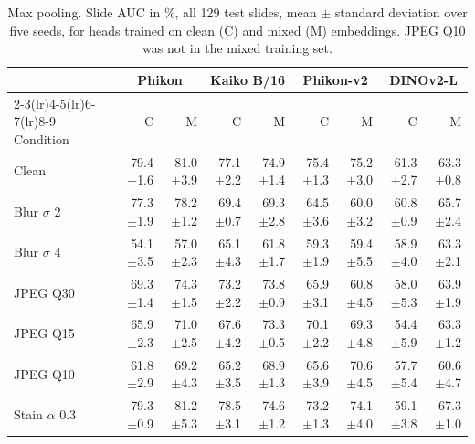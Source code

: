 \begin{table}[H]\centering\small
\caption{Max pooling. Slide AUC in \%, all 129 test slides, mean $\pm$ standard deviation over five seeds, for heads trained on clean (C) and mixed (M) embeddings. JPEG Q10 was not in the mixed training set.}
\label{tab:app-max}
\setlength{\tabcolsep}{3.5pt}
\begin{tabular}{lrrrrrrrr}
\toprule
 & \multicolumn{2}{c}{Phikon} & \multicolumn{2}{c}{Kaiko B/16} & \multicolumn{2}{c}{Phikon-v2} & \multicolumn{2}{c}{DINOv2-L}\\
\cmidrule(lr){2-3}\cmidrule(lr){4-5}\cmidrule(lr){6-7}\cmidrule(lr){8-9}
Condition & C & M & C & M & C & M & C & M\\
\midrule
Clean & 79.4{\scriptsize$\pm$1.6} & 81.0{\scriptsize$\pm$3.9} & 77.1{\scriptsize$\pm$2.2} & 74.9{\scriptsize$\pm$1.4} & 75.4{\scriptsize$\pm$1.3} & 75.2{\scriptsize$\pm$3.0} & 61.3{\scriptsize$\pm$2.7} & 63.3{\scriptsize$\pm$0.8}\\
Blur $\sigma$ 2 & 77.3{\scriptsize$\pm$1.9} & 78.2{\scriptsize$\pm$1.2} & 69.4{\scriptsize$\pm$0.7} & 69.3{\scriptsize$\pm$2.8} & 64.5{\scriptsize$\pm$3.6} & 60.0{\scriptsize$\pm$3.2} & 60.8{\scriptsize$\pm$0.9} & 65.7{\scriptsize$\pm$2.4}\\
Blur $\sigma$ 4 & 54.1{\scriptsize$\pm$3.5} & 57.0{\scriptsize$\pm$2.3} & 65.1{\scriptsize$\pm$4.3} & 61.8{\scriptsize$\pm$1.7} & 59.3{\scriptsize$\pm$1.9} & 59.4{\scriptsize$\pm$5.5} & 58.9{\scriptsize$\pm$4.0} & 63.3{\scriptsize$\pm$2.1}\\
JPEG Q30 & 69.3{\scriptsize$\pm$1.4} & 74.3{\scriptsize$\pm$1.5} & 73.2{\scriptsize$\pm$2.2} & 73.8{\scriptsize$\pm$0.9} & 65.9{\scriptsize$\pm$3.1} & 60.8{\scriptsize$\pm$4.5} & 58.0{\scriptsize$\pm$5.3} & 63.9{\scriptsize$\pm$1.9}\\
JPEG Q15 & 65.9{\scriptsize$\pm$2.3} & 71.0{\scriptsize$\pm$2.5} & 67.6{\scriptsize$\pm$4.2} & 73.3{\scriptsize$\pm$0.5} & 70.1{\scriptsize$\pm$2.2} & 69.3{\scriptsize$\pm$4.8} & 54.4{\scriptsize$\pm$5.9} & 63.3{\scriptsize$\pm$1.2}\\
JPEG Q10 & 61.8{\scriptsize$\pm$2.9} & 69.2{\scriptsize$\pm$4.3} & 65.2{\scriptsize$\pm$3.5} & 68.9{\scriptsize$\pm$1.3} & 65.6{\scriptsize$\pm$3.9} & 70.6{\scriptsize$\pm$4.5} & 57.7{\scriptsize$\pm$5.4} & 60.6{\scriptsize$\pm$4.7}\\
Stain $\alpha$ 0.3 & 79.3{\scriptsize$\pm$0.9} & 81.2{\scriptsize$\pm$5.3} & 78.5{\scriptsize$\pm$3.1} & 74.6{\scriptsize$\pm$1.2} & 73.2{\scriptsize$\pm$1.3} & 74.1{\scriptsize$\pm$4.0} & 59.1{\scriptsize$\pm$3.8} & 67.3{\scriptsize$\pm$1.0}\\
\bottomrule
\end{tabular}
\end{table}

